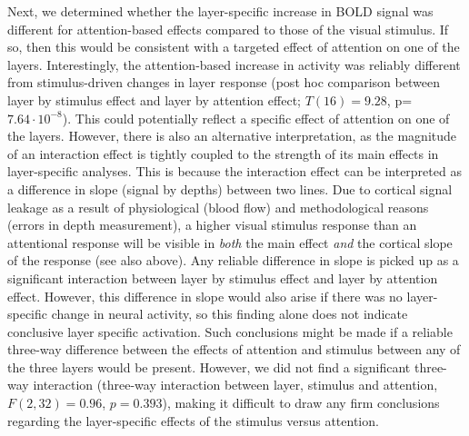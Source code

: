 \documentclass[9pt,lineno]{aperture}
\begin{document}
Next, we determined whether the layer-specific increase in BOLD signal was different for attention-based effects compared to those of the visual stimulus. If so, then this would be consistent with a targeted effect of attention on one of the layers. Interestingly, the attention-based increase in activity was reliably different from stimulus-driven changes in layer response (post hoc comparison between layer by stimulus effect and layer by attention effect; $T(16)=9.28$, p=$7.64\cdot10^{-8}$). This could potentially reflect a specific effect of attention on one of the layers. However, there is also an alternative interpretation, as the magnitude of an interaction effect is tightly coupled to the strength of its main effects in layer-specific analyses. 
This is because the interaction effect can be interpreted as a difference in slope (signal by depths) between two lines. Due to cortical signal leakage as a result of physiological (blood flow) and methodological reasons (errors in depth measurement), a higher visual stimulus response than an attentional response will be visible in \emph{both} the main effect \emph{and} the cortical slope of the response (see also above). Any reliable difference in slope is picked up as a significant interaction between layer by stimulus effect and layer by attention effect. However, this difference in slope would also arise if there was no layer-specific change in neural activity, so this finding alone does not indicate conclusive layer specific activation. Such conclusions might be made if a reliable three-way difference between the effects of attention and stimulus between any of the three layers would be present. However, we did not find a significant three-way interaction (three-way interaction between layer, stimulus and attention, $F(2,32)=0.96$, $p=0.393$), making it difficult to draw any firm conclusions regarding the layer-specific effects of the stimulus versus attention.
\end{document}

